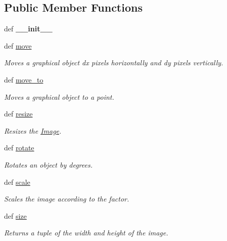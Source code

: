 \subsection*{Public Member Functions}
\begin{DoxyCompactItemize}
\item 
\hypertarget{classcs110graphics_1_1Image_a3b7c128fa18d85ff4a7586fac04a1bc2}{
def {\bfseries \_\-\_\-init\_\-\_\-}}
\label{classcs110graphics_1_1Image_a3b7c128fa18d85ff4a7586fac04a1bc2}

\item 
def \hyperlink{classcs110graphics_1_1Image_a540d48247976343a91c610009a9af8cd}{move}
\begin{DoxyCompactList}\small\item\em Moves a graphical object dx pixels horizontally and dy pixels vertically. \item\end{DoxyCompactList}\item 
def \hyperlink{classcs110graphics_1_1Image_a4b2e775fbb0cb523f6bc09028dc05c65}{move\_\-to}
\begin{DoxyCompactList}\small\item\em Moves a graphical object to a point. \item\end{DoxyCompactList}\item 
def \hyperlink{classcs110graphics_1_1Image_a0754151035bb2892f0cd3895b64488fa}{resize}
\begin{DoxyCompactList}\small\item\em Resizes the \hyperlink{classcs110graphics_1_1Image}{Image}. \item\end{DoxyCompactList}\item 
def \hyperlink{classcs110graphics_1_1Image_ac58717d68279e536cee608e2bdfc6aa8}{rotate}
\begin{DoxyCompactList}\small\item\em Rotates an object by degrees. \item\end{DoxyCompactList}\item 
def \hyperlink{classcs110graphics_1_1Image_a7a59fde33fe83916a4155fafb5cfb01e}{scale}
\begin{DoxyCompactList}\small\item\em Scales the image according to the factor. \item\end{DoxyCompactList}\item 
def \hyperlink{classcs110graphics_1_1Image_a4ff2da7a167a433f2c38f1e2e2fe7263}{size}
\begin{DoxyCompactList}\small\item\em Returns a tuple of the width and height of the image. \item\end{DoxyCompactList}\end{DoxyCompactItemize}


